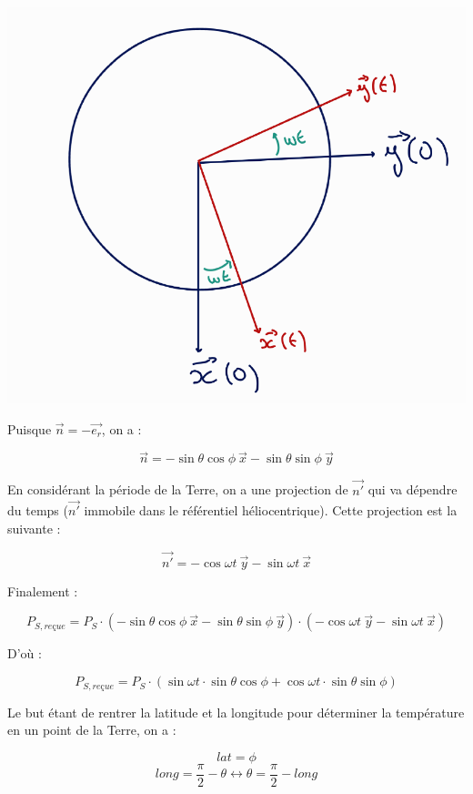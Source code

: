 \documentclass[a4paper,11pt]{article}
\begin{document}
\begin{adjustbox}{center}
\includegraphics[scale=0.5]{projete_omega_t}
\end{adjustbox}
Puisque $ \vec{n} = -\overrightarrow{e_r}$, on a :

\[ \vec{n} = - \sin \theta \cos \phi ~ \vec{x} - \sin \theta \sin \phi ~ \vec{y} \]

En considérant la période de la Terre, on a une projection de $\vec{n'}$ qui va dépendre du temps ($\vec{n'}$ immobile dans le référentiel héliocentrique). Cette projection est la suivante :

\[ \vec{n'} = - \cos \omega t ~ \vec{y} - \sin \omega t ~ \vec{x} \]

Finalement :

\[ P_{S,reçue} = P_S \cdot (- \sin \theta \cos \phi ~ \vec{x} - \sin \theta \sin \phi ~ \vec{y}) \cdot (- \cos \omega t ~ \vec{y} - \sin \omega t ~ \vec{x}) \]

D'où :

\[ P_{S,reçue} = P_S \cdot (\sin \omega t \cdot \sin \theta \cos \phi + \cos \omega t \cdot \sin \theta \sin \phi) \]

Le but étant de rentrer la latitude et la longitude pour déterminer la température en un point de la Terre, on a :

\[ lat = \phi \]
\[ long = \dfrac{\pi}{2} - \theta \leftrightarrow \theta = \dfrac{\pi}{2} - long \]
\end{document}
